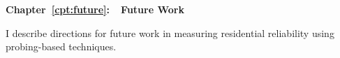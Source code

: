 \textbf{Chapter~\ref{cpt:future}:~~Future Work} 

I describe directions for future work in measuring residential
reliability using probing-based techniques.









